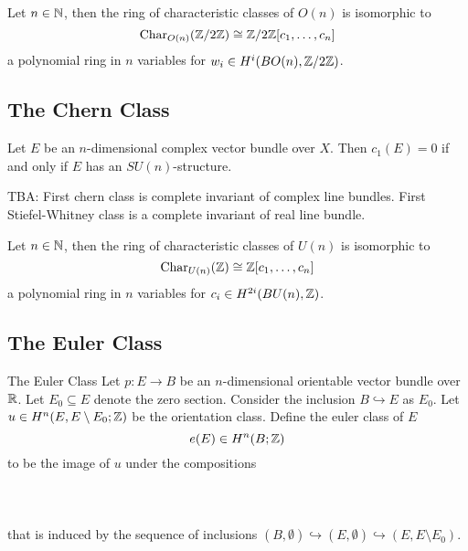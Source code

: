 \documentclass[a4paper]{article}
\begin{document}
\begin{thm}{}{} Let $n\in\mathbb{N}$, then the ring of characteristic classes of $O(n)$ is isomorphic to $$\text{Char}_{O(n)}(\mathbb{Z}/2\mathbb{Z})\cong\mathbb{Z}/2\mathbb{Z}[c_1,\dots,c_n]$$ a polynomial ring in $n$ variables for $w_i\in H^i(BO(n),\mathbb{Z}/2\mathbb{Z})$. 
\end{thm}

\subsection{The Chern Class}


\begin{thm}{}{} Let $E$ be an $n$-dimensional complex vector bundle over $X$. Then $c_1(E)=0$ if and only if $E$ has an $SU(n)$-structure. 
\end{thm}

TBA: First chern class is complete invariant of complex line bundles. First Stiefel-Whitney class is a complete invariant of real line bundle. 

\begin{thm}{}{} Let $n\in\mathbb{N}$, then the ring of characteristic classes of $U(n)$ is isomorphic to $$\text{Char}_{U(n)}(\mathbb{Z})\cong\mathbb{Z}[c_1,\dots,c_n]$$ a polynomial ring in $n$ variables for $c_i\in H^{2i}(BU(n),\mathbb{Z})$. 
\end{thm}

\subsection{The Euler Class}
\begin{defn}{The Euler Class}{} Let $p:E\to B$ be an $n$-dimensional orientable vector bundle over $\mathbb{R}$. Let $E_0\subseteq E$ denote the zero section. Consider the inclusion $B\hookrightarrow E$ as $E_0$. Let $u\in H^n(E,E\setminus E_0;\mathbb{Z})$ be the orientation class. Define the euler class of $E$ $$e(E)\in H^n(B;\mathbb{Z})$$ to be the image of $u$ under the compositions \\~\\
\\~\\
that is induced by the sequence of inclusions $(B,\emptyset)\hookrightarrow(E,\emptyset)\hookrightarrow(E,E\setminus E_0)$.
\end{defn}
\end{document}
